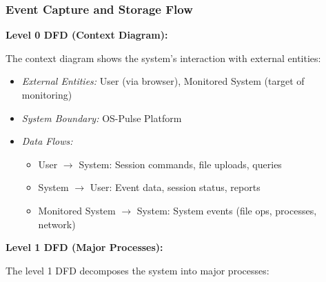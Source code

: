 \subsubsection{Event Capture and Storage Flow}

\textbf{Level 0 DFD (Context Diagram):}

The context diagram shows the system's interaction with external entities:

\begin{itemize}
    \item \textit{External Entities:} User (via browser), Monitored System (target of monitoring)
    \item \textit{System Boundary:} OS-Pulse Platform
    \item \textit{Data Flows:}
    \begin{itemize}
        \item User $\rightarrow$ System: Session commands, file uploads, queries
        \item System $\rightarrow$ User: Event data, session status, reports
        \item Monitored System $\rightarrow$ System: System events (file ops, processes, network)
    \end{itemize}
\end{itemize}

\textbf{Level 1 DFD (Major Processes):}

The level 1 DFD decomposes the system into major processes:

